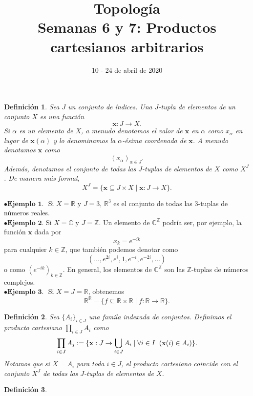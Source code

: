 \documentclass{article}
\newtheorem{definition}{Definición}
\begin{document}
\date{10 - 24 de abril de 2020}
\title{ \textbf{Topología} \\
Semanas 6 y 7: Productos cartesianos arbitrarios}
\maketitle	

\begin{definition}
	Sea $J$ un conjunto de índices. Una $J$-tupla de elementos de un conjunto $X$ es una función 
	$$ \mathbf{x}: J \rightarrow X. $$
	Si $\alpha$ es un elemento de $X$, a menudo denotamos el valor de $\mathbf{x}$ en $\alpha$ como $x_{\alpha}$ en lugar de $\mathbf{x}(\alpha)$ y lo denominamos la $\alpha$-ésima coordenada de $\mathbf{x}$. A menudo denotamos $\mathbf{x}$ como 
	$$ (x_{\alpha})_{\alpha \in J} .$$
	Además, denotamos el conjunto de todas las $J$-tuplas de elementos de $X$ como $X^{J}$. De manera más formal,
	$$ X^{J} = \{ \mathbf{x} \subseteq J \times X \mid \mathbf{x}: J \rightarrow X \}. $$ 
\end{definition}

$\bullet \textbf{Ejemplo 1. }$ Si $X = \mathbb{R}$ y $J = 3$, $\mathbb{R}^{3}$ es el conjunto de todas las $3$-tuplas de números reales. \\

$\bullet \textbf{Ejemplo 2.}$ Si $X = \mathbb{C}$ y $J = \mathbb{Z}$. Un elemento de $\mathbb{C}^{\mathbb{Z}}$ podría ser, por ejemplo, la función $\mathbf{x}$ dada por 
$$ x_{k} = e^{-ik} $$
para cualquier $k \in \mathbb{Z}$, que también podemos denotar como
$$ (\ldots,e^{2i}, e^{i}, 1, e^{-i}, e^{-2i} ,\ldots) $$
o como $(e^{-ik})_{k \in \mathbb{Z}}$. En general, los elementos de $\mathbb{C}^{\mathbb{Z}}$ son las $\mathbb{Z}$-tuplas de números complejos. \\

$\bullet \textbf{Ejemplo 3. }$ Si $X = J = \mathbb{R}$, obtenemos
$$ \mathbb{R}^{\mathbb{R}} = \{ f \subseteq \mathbb{R} \times \mathbb{R} \mid f: \mathbb{R} \rightarrow \mathbb{R} \} .$$

\begin{definition}
	Sea $\{ A_{i} \}_{i \in J}$ una famila indexada de conjuntos. Definimos el producto cartesiano $\prod_{i \in J} A_{i}$ como 
	$$ \prod_{i \in J} A_{j} := \{ \mathbf{x}: J \rightarrow \bigcup_{i \in J} A_{i}  \mid \forall i \in I \hspace{0.2cm} ( \mathbf{x}(i) \in A_{i} ) \}.$$
	Notamos que si $X = A_{i}$ para toda $i \in J$, el producto cartesiano coincide con el conjunto $X^{J}$ de todas las $J$-tuplas de elementos de $X$. 
\end{definition}

\begin{definition}
	
\end{definition}
\end{document}
